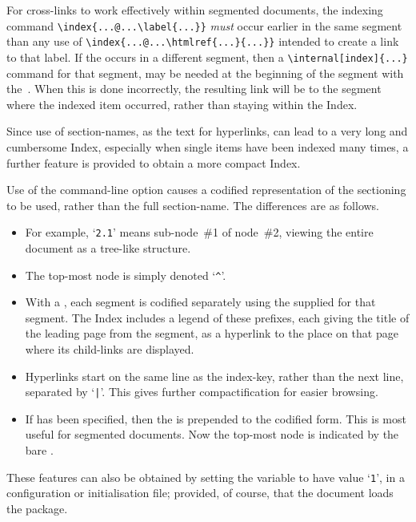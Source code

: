 %

For cross-links to work effectively within segmented documents,
the indexing command 
\verb|\index{...@...\label{...}}| \emph{must} occur earlier 
in the same segment than any use of 
\verb|\index{...@...\htmlref{...}{...}}| 
intended to create a link to that label. 
If the  occurs in a different segment,
then a \verb|\internal[index]{...}| command for that segment,
may be needed at the beginning of the segment with the \,.
When this is done incorrectly, the resulting link will be to the
segment where the indexed item occurred, 
rather than staying within the Index.

\htmlrule
{}%
%

\noindent
Since use of section-names, as the text for hyperlinks, can lead to a very long
and cumbersome Index, especially when single items have been indexed many times,
a further feature is provided to obtain a more compact Index.
 
\html{\\}%
Use of the command-line option  causes a codified 
representation of the sectioning to be used, rather than the full section-name.
The differences are as follows.
%
\begin{itemize}
%
\item
For example, `\texttt{2.1}' means sub-node~\#1 of node~\#2, 
viewing the entire document as a tree-like structure. 

%
\item
The top-most node is simply denoted `\verb|^|'.

%
%
\item
With a , 
each segment is codified separately 
using the  supplied for that segment.
The Index includes a legend of these prefixes, 
each giving the title of the leading page from the segment,
as a hyperlink to the place on that page where its 
child-links are displayed.

%
\item
Hyperlinks start on the same line as the index-key, 
rather than the next line, separated by `\texttt{|}'. 
This gives further compactification for easier browsing.

%
\item
If  has been specified, then the 
is prepended to the codified form. This is most useful for segmented documents. 
Now the top-most node is indicated by the bare .
\end{itemize}
%
These features can also be obtained by setting the variable 
to have value `\texttt{1}', in a configuration or initialisation file;
provided, of course, that the document loads the  package.%

